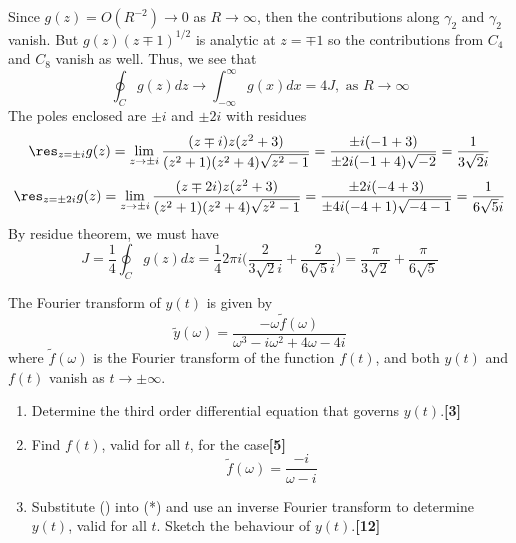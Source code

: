 \documentclass[a4paper]{article}
\begin{document}
\begin{ans}
\begin{enumerate}[label=(\alph*)]
\begin{enumerate}[label=(\roman*)]
\begin{center}
  \end{center}
Since $g(z)=O(R^{-2})\rightarrow 0$ as $R\rightarrow\infty$, then the contributions along $\gamma_2$ and $\gamma_2$ vanish. But $g(z)(z\mp1)^{1/2}$ is analytic at $z=\mp 1$ so the contributions from $C_4$ and $C_8$ vanish as well. Thus, we see that
$$\oint_Cg(z)dz\rightarrow \int_{-\infty}^\infty g(x)dx=4J,\text{ as }R\rightarrow\infty$$
The poles enclosed are $\pm i$ and $\pm 2i$ with residues
$$\res_{z=\pm i}g(z)=\lim_{z\rightarrow\pm i}\frac{(z\mp i)z(z^2+3)}{(z^2+1)(z^2+4)\sqrt{z^2-1}}=\frac{\pm i(-1+3)}{\pm 2i(-1+4)\sqrt{-2}}=\frac{1}{3\sqrt{2}i}$$
$$\res_{z=\pm2i}g(z)=\lim_{z\rightarrow\pm i}\frac{(z\mp 2i)z(z^2+3)}{(z^2+1)(z^2+4)\sqrt{z^2-1}}=\frac{\pm 2i(-4+3)}{\pm 4i(-4+1)\sqrt{-4-1}}=\frac{1}{6\sqrt{5}i}$$
By residue theorem, we must have
$$J=\frac{1}{4}\oint_Cg(z)dz=\frac{1}{4}2\pi i\bigg(\frac{2}{3\sqrt{2}i}+\frac{2}{6\sqrt{5}i}\bigg)=\frac{\pi}{3\sqrt{2}}+\frac{\pi}{6\sqrt{5}}$$
\end{enumerate}
\end{enumerate}
\end{ans}
\newpage
\begin{qns}
The Fourier transform of $y(t)$ is given by
\begin{equation}
    \tilde{y}(\omega)=\frac{-\omega\tilde{f}(\omega)}{\omega^3-i\omega^2+4\omega-4i}\tag{*}
\end{equation}
where $\tilde{f}(\omega)$ is the Fourier transform of the function $f(t)$, and both $y(t)$ and $f(t)$ vanish as $t\rightarrow\pm\infty$.
\begin{enumerate}[label=(\alph*)]
\item Determine the third order differential equation that governs $y(t)$.\hfill\textbf{[3]}
\item Find $f(t)$, valid for all $t$, for the case\hfill\textbf{[5]}
\begin{equation}
    \tilde{f}(\omega)=\frac{-i}{\omega-i}\tag{\dag}
\end{equation}
\item Substitute (\dag) into (*) and use an inverse Fourier transform to determine $y(t)$, valid for all $t$. Sketch the behaviour of $y(t)$.\hfill\textbf{[12]}
\end{enumerate}
\end{qns}
\end{document}
